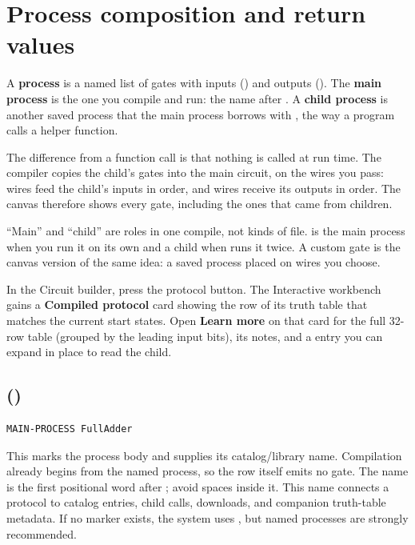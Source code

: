 \section{Process composition and return values}
\hypertarget{process-composition}{}

\begin{beginnerbox}
A \textbf{process} is a named list of gates with inputs () and
outputs (). The \textbf{main process} is the one you compile
and run: the name after . A \textbf{child process} is
another saved process that the main process borrows with , the
way a program calls a helper function.

The difference from a function call is that nothing is called at run time.
The compiler copies the child's gates into the main circuit, on the wires you
pass:  wires feed the child's inputs in  order, and
 wires receive its outputs in  order. The canvas
therefore shows every gate, including the ones that came from children.

``Main'' and ``child'' are roles in one compile, not kinds of file.
 is the main process when you run it on its own and a
child when  runs it twice. A custom gate is the canvas
version of the same idea: a saved process placed on wires you choose.
\end{beginnerbox}

\begin{trybox}
In the Circuit builder, press the  protocol button. The
Interactive workbench gains a \textbf{Compiled protocol} card showing the row
of its truth table that matches the current start states. Open
\textbf{Learn more} on that card for the full 32-row table (grouped by the
leading input bits), its notes, and a  entry you can
expand in place to read the child.
\end{trybox}

\subsection{ (\implemented)}

\begin{lstlisting}
MAIN-PROCESS FullAdder
\end{lstlisting}
This marks the process body and supplies its catalog/library name. Compilation
already begins from the named process, so the row itself emits no gate.
The name is the first positional word after ; avoid spaces
inside it. This name connects a protocol to catalog entries, child calls,
downloads, and companion truth-table metadata. If no marker exists, the system
uses , but named processes are strongly recommended.

